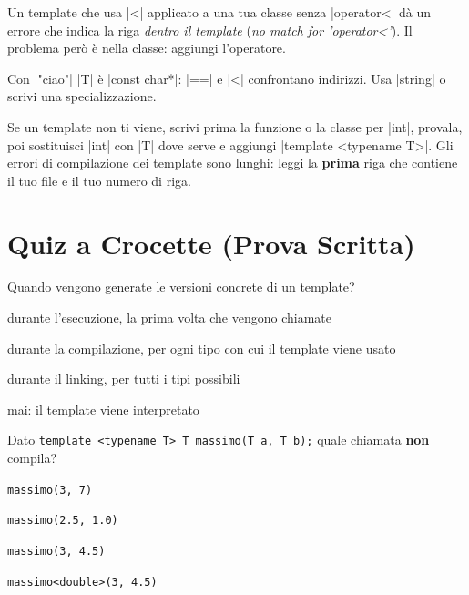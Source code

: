 \begin{trappola}
Un template che usa \cc|<| applicato a una tua classe senza \cc|operator<| dà un
errore che indica la riga \emph{dentro il template} (\emph{no match for 'operator<'}).
Il problema però è nella classe: aggiungi l'operatore.
\end{trappola}

\begin{trappola}
Con \cc|"ciao"| \cc|T| è \cc|const char*|: \cc|==| e \cc|<| confrontano indirizzi.
Usa \cc|string| o scrivi una specializzazione.
\end{trappola}

\begin{consiglio}
Se un template non ti viene, scrivi prima la funzione o la classe per \cc|int|,
provala, poi sostituisci \cc|int| con \cc|T| dove serve e aggiungi
\cc|template <typename T>|. Gli errori di compilazione dei template sono lunghi:
leggi la \textbf{prima} riga che contiene il tuo file e il tuo numero di riga.
\end{consiglio}

\section{Quiz a Crocette (Prova Scritta)}

\begin{quiz}{Quando vengono generate le versioni concrete di un template?}
  \item durante l'esecuzione, la prima volta che vengono chiamate
  \item durante la compilazione, per ogni tipo con cui il template viene usato
  \item durante il linking, per tutti i tipi possibili
  \item mai: il template viene interpretato
\end{quiz}

\begin{quiz}{Dato \texttt{template <typename T> T massimo(T a, T b);} quale chiamata \textbf{non} compila?}
  \item \texttt{massimo(3, 7)}
  \item \texttt{massimo(2.5, 1.0)}
  \item \texttt{massimo(3, 4.5)}
  \item \texttt{massimo<double>(3, 4.5)}
\end{quiz}

